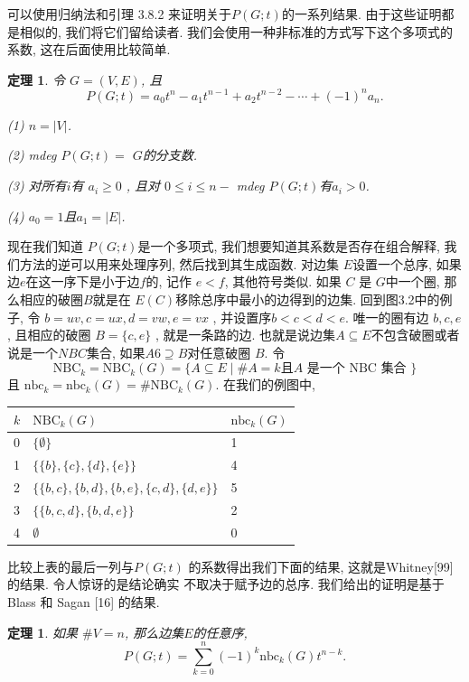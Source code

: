 \documentclass[a4paper,12pt]{ctexbook}
\newtheorem{theorem}[lemma]{\hspace{2em}定理}%
\begin{document}
可以使用归纳法和引理 3.8.2 来证明关于$P(G ; t)$的一系列结果. 由于这些证明都是相似的, 我们将它们留给读者. 我们会使用一种非标准的方式写下这个多项式的系数, 这在后面使用比较简单.

\begin{theorem}
	令 $G=(V, E)$, 且
$$
P(G ; t)=a_{0} t^{n}-a_{1} t^{n-1}+a_{2} t^{n-2}-\cdots+(-1)^{n} a_{n} .
$$

(1) $n=|V|$.

(2) mdeg $P(G ; t)=$ $G$的分支数.

(3) 对所有$i$有 $a_{i} \geq 0$ , 且对 $0 \leq i \leq n-$ mdeg $P(G ; t)$有$a_{i}>0$.

(4) $a_{0}=1$且$a_{1}=| E|$.
\end{theorem}
现在我们知道 $P(G ; t)$是一个多项式, 我们想要知道其系数是否存在组合解释, 我们方法的逆可以用来处理序列, 然后找到其生成函数. 对边集 $E$设置一个总序, 如果边$e$在这一序下是小于边$f$的, 记作 $e<f$, 其他符号类似. 如果  $C$ 是 $G$中一个圈, 那么相应的破圈$B$就是在 $E(C)$移除总序中最小的边得到的边集. 回到图3.2中的例子, 令 $b=u v, c=u x, d=v w, e=v x$ , 并设置序$b<c<d<e$. 唯一的圈有边 $b, c, e$ , 且相应的破圈 $B=\{c, e\}$ , 就是一条路的边. 也就是说边集$A \subseteq E$不包含破圈或者说是一个$NBC$集合, 如果$A 6 \supseteq B$对任意破圈 $B$. 令
$$
\mathrm{NBC}_{k}=\mathrm{NBC}_{k}(G)=\{A \subseteq E \mid \# A=k \text {且} A \text { 是一个 } \mathrm{NBC} \text { 集合 }\}
$$
且 $\mathrm{nbc}_{k}=\mathrm{nbc}_{k}(G)=\# \mathrm{NBC}_{k}(G) $. 在我们的例图中,
\begin{table}[h]
	\centering
	\begin{tabular}{l|l|l}
		$k$ & $\mathrm{NBC}_{k}(G)$ & $\mathrm{nbc}_{k}(G)$ \\
		\hline \hline 0 & $\{\emptyset\}$ & 1 \\
		1 & $\{\{b\},\{c\},\{d\},\{e\}\}$ & 4 \\
		2 & $\{\{b, c\},\{b, d\},\{b, e\},\{c, d\},\{d, e\}\}$ & 5 \\
		3 & $\{\{b, c, d\},\{b, d, e\}\}$ & 2 \\
		4 & $\emptyset$ & 0
	\end{tabular}
\end{table}
比较上表的最后一列与$P(G ; t)$ 的系数得出我们下面的结果, 这就是Whitney[99]的结果. 令人惊讶的是结论确实
不取决于赋予边的总序. 我们给出的证明是基于Blass 和 Sagan [16] 的结果.
\begin{theorem}
	如果 $\# V=n$, 那么边集$E$的任意序,
	$$
	P(G ; t)=\sum_{k=0}^{n}(-1)^{k} \mathrm{nbc}_{k}(G) t^{n-k} .
	$$
\end{theorem}
\end{document}
